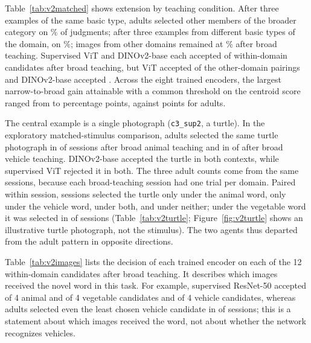 \documentclass[11pt]{article}
\begin{document}
Table~\ref{tab:v2matched} shows extension by teaching condition. After three examples of the same basic type, adults selected other members of the broader category on \VtXSameBasicPct\% of judgments; after three examples from different basic types of the domain, on \VtXBroadPct\%; images from other domains remained at \VtXOutBroadPct\% after broad teaching. Supervised ViT and DINOv2-base each accepted \VtXViTIn{} of \VtXInN{} within-domain candidates after broad teaching, but ViT accepted \VtXViTOut{} of the \VtXOutN{} other-domain pairings and DINOv2-base accepted \VtXDinoBOut. Across the eight trained encoders, the largest narrow-to-broad gain attainable with a common threshold on the centroid score ranged from \VtXJumpMin{} to \VtXJumpMax{} percentage points, against \VtXJumpAdult{} points for adults.

The central example is a single photograph (\texttt{c3\_sup2}, a turtle). In the exploratory matched-stimulus comparison, adults selected the same turtle photograph in \VtTurtleAnimalsK{} of \VtTurtleSessions{} sessions after broad animal teaching and in \VtTurtleVehiclesK{} of \VtTurtleSessions{} after broad vehicle teaching. DINOv2-base accepted the turtle in both contexts, while supervised ViT rejected it in both. The three adult counts come from the same \VtTurtleSessions{} sessions, because each broad-teaching session had one trial per domain. Paired within session, \VtTurtleOnlyAnimals{} sessions selected the turtle only under the animal word, \VtTurtleOnlyVehicles{} only under the vehicle word, \VtTurtleBoth{} under both, and \VtTurtleNeither{} under neither; under the vegetable word it was selected in \VtTurtleVegK{} of \VtTurtleSessions{} sessions (Table~\ref{tab:v2turtle}; Figure~\ref{fig:v2turtle} shows an illustrative turtle photograph, not the stimulus). The two agents thus departed from the adult pattern in opposite directions.

Table~\ref{tab:v2images} lists the decision of each trained encoder on each of the 12 within-domain candidates after broad teaching. It describes which images received the novel word in this task. For example, supervised ResNet-50 accepted \VtXEthreeAnimals{} of 4 animal and \VtXEthreeVeg{} of 4 vegetable candidates and \VtXEthreeVeh{} of 4 vehicle candidates, whereas adults selected even the least chosen vehicle candidate in \VtXRailcarK{} of \VtXPerCell{} sessions; this is a statement about which images received the word, not about whether the network recognizes vehicles.
\end{document}
